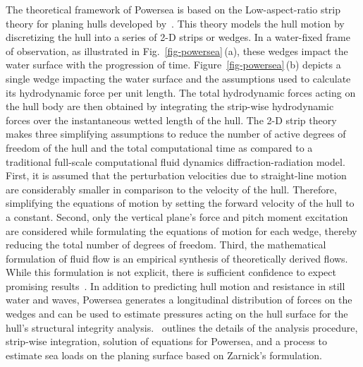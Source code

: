 The theoretical framework of Powersea is based on the Low-aspect-ratio strip theory for planing hulls developed by~\cite{zarnick_nonlinear_1978, zarnick_nonlinear_1979}. This theory models the hull motion by discretizing the hull into a series of 2-D strips or wedges. In a water-fixed frame of observation, as illustrated in Fig.~\ref{fig-powersea}\,(a), these wedges impact the water surface with the progression of time. Figure~\ref{fig-powersea}\,(b) depicts a single wedge impacting the water surface and the assumptions used to calculate its hydrodynamic force per unit length. The total hydrodynamic forces acting on the hull body are then obtained by integrating the strip-wise hydrodynamic forces over the instantaneous wetted length of the hull. The 2-D strip theory makes three simplifying assumptions to reduce the number of active degrees of freedom of the hull and the total computational time as compared to a traditional full-scale computational fluid dynamics diffraction-radiation model. First, it is assumed that the perturbation velocities due to straight-line motion are considerably smaller in comparison to the velocity of the hull. Therefore, simplifying the equations of motion by setting the forward velocity of the hull to a constant. Second, only the vertical plane's force and pitch moment excitation are considered while formulating the equations of motion for each wedge, thereby reducing the total number of degrees of freedom. Third, the mathematical formulation of fluid flow is an empirical synthesis of theoretically derived flows. While this formulation is not explicit, there is sufficient confidence to expect promising results~\cite{faltinsen_numerical_1991,sun_planing_2007, korobkin_hydro_2017}. In addition to predicting hull motion and resistance in still water and waves, Powersea generates a longitudinal distribution of forces on the wedges and can be used to estimate pressures acting on the hull surface for the hull's structural integrity analysis.~\cite{akers_dynamic_1999} outlines the details of the analysis procedure, strip-wise integration, solution of equations for Powersea, and a process to estimate sea loads on the planing surface based on Zarnick's formulation.


